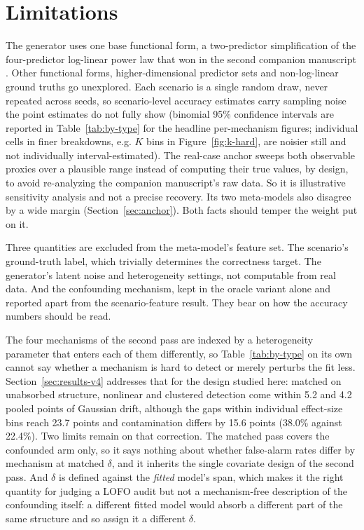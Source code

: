 \documentclass[journal=dce]{CUP-JNL-DTM}%
\begin{document}
\section{Limitations}

The generator uses one base functional form, a two-predictor simplification of the four-predictor log-linear power law that won in the second companion manuscript \citep{gilruiz2026paper2}. Other functional forms, higher-dimensional predictor sets and non-log-linear ground truths go unexplored. Each scenario is a single random draw, never repeated across seeds, so scenario-level accuracy estimates carry sampling noise the point estimates do not fully show (binomial 95\% confidence intervals are reported in Table~\ref{tab:by-type} for the headline per-mechanism figures; individual cells in finer breakdowns, e.g. $K$ bins in Figure~\ref{fig:k-hard}, are noisier still and not individually interval-estimated). The real-case anchor sweeps both observable proxies over a plausible range instead of computing their true values, by design, to avoid re-analyzing the companion manuscript's raw data. So it is illustrative sensitivity analysis and not a precise recovery. Its two meta-models also disagree by a wide margin (Section~\ref{sec:anchor}). Both facts should temper the weight put on it.

Three quantities are excluded from the meta-model's feature set. The scenario's ground-truth label, which trivially determines the correctness target. The generator's latent noise and heterogeneity settings, not computable from real data. And the confounding mechanism, kept in the oracle variant alone and reported apart from the scenario-feature result. They bear on how the accuracy numbers should be read.


The four mechanisms of the second pass are indexed by a heterogeneity parameter that enters each of them differently, so Table~\ref{tab:by-type} on its own cannot say whether a mechanism is hard to detect or merely perturbs the fit less. Section~\ref{sec:results-v4} addresses that for the design studied here: matched on unabsorbed structure, nonlinear and clustered detection come within 5.2 and 4.2 pooled points of Gaussian drift, although the gaps within individual effect-size bins reach 23.7 points and contamination differs by 15.6 points (38.0\% against 22.4\%). Two limits remain on that correction. The matched pass covers the confounded arm only, so it says nothing about whether false-alarm rates differ by mechanism at matched $\delta$, and it inherits the single covariate design of the second pass. And $\delta$ is defined against the \emph{fitted} model's span, which makes it the right quantity for judging a LOFO audit but not a mechanism-free description of the confounding itself: a different fitted model would absorb a different part of the same structure and so assign it a different $\delta$.
\end{document}
